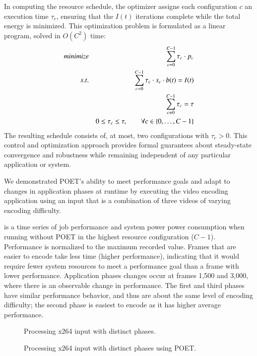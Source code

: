In computing the resource schedule, the optimizer assigns each configuration $c$ an execution time $\tau_c$, ensuring that the $I(t)$ iterations complete while the total energy is minimized.
This optimization problem is formulated as a linear program, solved in $O(C^2)$ time:
\begin{eqnarray}
\minimize && \sum_{c=0}^{C-1} \tau_c \cdot p_c \label{eqn:poet-power} \\
\st %
&& \sum_{c=0}^{C-1} \tau_c \cdot s_c \cdot b(t) =  I(t) \label{eqn:poet-work} \\
&& \sum_{c=0}^{C-1} \tau_c =  \tau \label{eqn:poet-deadline} \\
&& 0 \le \tau_c \le \tau, \qquad \forall c \in \{0,\ldots,C-1\} \label{eqn:poet-time}
\end{eqnarray}
The resulting schedule consists of, at most, two configurations with $\tau_c > 0$.
This control and optimization approach provides formal guarantees about steady-state convergence and robustness while remaining independent of any particular application or system.

We demonstrated POET's ability to meet performance goals and adapt to changes in application phases at runtime by executing the  video encoding application using an input that is a combination of three videos of varying encoding difficulty.

 is a time series of job performance and system power power consumption when running  without POET in the highest resource configuration ($C-1$).
Performance is normalized to the maximum recorded value.
Frames that are easier to encode take less time (higher performance), indicating that it would require fewer system resources to meet a performance goal than a frame with lower performance.
Application phases changes occur at frames 1,500 and 3,000, where there is an observable change in performance.
The first and third phases have similar performance behavior, and thus are about the same level of encoding difficulty; the second phase is easiest to encode as it has higher average performance.

\begin{figure}[t]
  
  \caption{Processing x264 input with distinct phases.}
  \label{fig:poet-phases-default}
\end{figure}

\begin{figure}[t]
  
  \caption{Processing x264 input with distinct phases using POET.}
  \label{fig:poet-phases-x264}
\end{figure}

